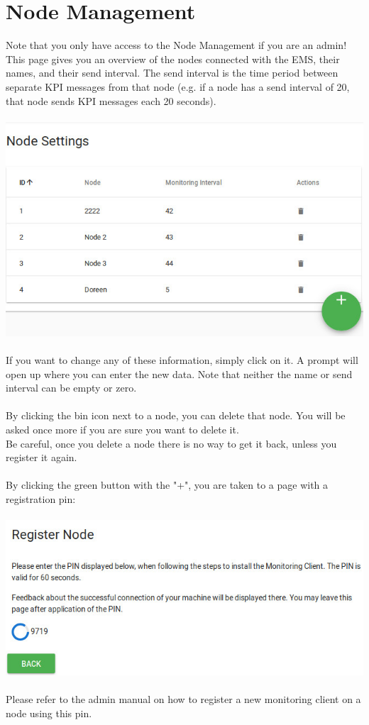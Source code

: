 \documentclass[twoside,a4paper]{refart}
\begin{document}
\section{Node Management}
Note that you only have access to the Node Management if you are an admin! \\
This page gives you an overview of the nodes connected with the EMS, their names, and their send interval. The send interval is the time period between separate KPI messages from that node (e.g. if a node has a send interval of 20, that node sends KPI messages each 20 seconds). \\ \\
\includegraphics[width=\linewidth]{nodeoverview.jpeg} \\ \\
If you want to change any of these information, simply click on it. A prompt will open up where you can enter the new data. Note that neither the name or send interval can be empty or zero. \\ \\
By clicking the bin icon next to a node, you can delete that node. You will be asked once more if you are sure you want to delete it.  \\
Be careful, once you delete a node there is no way to get it back, unless you register it again. \\ \\
By clicking the green button with the "+", you are taken to a page with a registration pin: \\ \\
\includegraphics[width=\linewidth]{nodepin.jpeg} \\ \\
Please refer to the admin manual on how to register a new monitoring client on a node using this pin.
\end{document}
